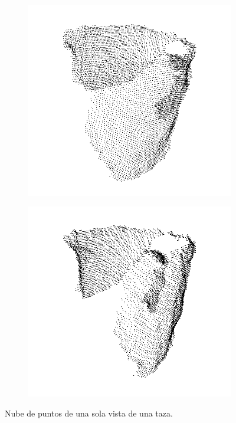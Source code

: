 \begin{figure}[t]
	\begin{subfigure}[b]{0.4\textwidth}
		\includegraphics[width=\textwidth]{img/ejemplos_nubes/taza_03.png}
	\end{subfigure}
	\quad
	\begin{subfigure}[b]{0.4\textwidth}
		\includegraphics[width=\textwidth]{img/ejemplos_nubes/taza_04.png}
	\end{subfigure}

	\caption{Nube de puntos de una sola vista de una taza.}
	\label{fig:nube_simple}
\end{figure}

